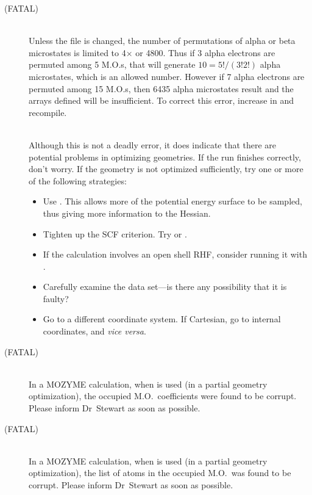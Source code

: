 \begin{description}
\item[ (FATAL)]~\\
Unless the file  is changed, the number of permutations of  alpha
or beta microstates is  limited to 4$\times$ or 4800.  Thus  if 3
alpha electrons are permuted among 5 M.O.s, that will generate $10 = 5!/(3!2!)$
alpha microstates, which is an allowed  number. However  if 7 alpha electrons
are permuted among 15 M.O.s, then 6435 alpha microstates result and the arrays
defined will  be  insufficient.    To correct this error, increase 
in  and recompile.


\item[]~\\
Although this is not a deadly error, it does indicate that there are potential
problems in optimizing geometries.  If the run finishes correctly, don't worry.
If the geometry is not optimized sufficiently, try one or more of the following
strategies:
\begin{itemize}
\item Use .  This allows more of the potential energy surface to
be sampled, thus giving more information to the Hessian.
\item Tighten up the SCF criterion.  Try  or .
\item If the calculation involves an open shell RHF, consider running it with 
.
\item Carefully examine the data set---is there any possibility that it is
faulty?
\item Go to a different coordinate system.  If Cartesian, go to internal
coordinates, and {\em vice versa}.
\end{itemize}

\item[ (FATAL)]~\\
In a MOZYME calculation, when  is used (in a partial geometry 
optimization), the occupied M.O.\ coefficients were found to be corrupt.
Please inform Dr~Stewart as soon as possible.

\item[ (FATAL)]~\\
In a MOZYME calculation, when  is used (in a partial geometry 
optimization), the list of atoms in the occupied M.O.\ was found to be corrupt.
Please inform Dr~Stewart as soon as possible.


\end{description}
